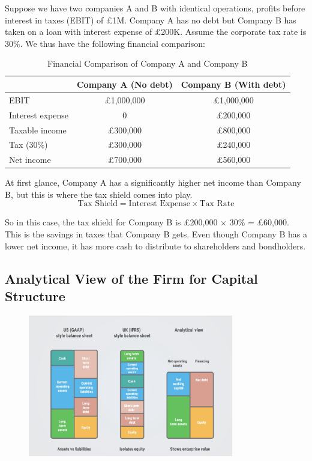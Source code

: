 Suppose we have two companies A and B with identical operations, profits before interest in taxes (EBIT) of £1M. Company A has no debt but Company B has taken on a loan with interest expense of £200K. Assume the corporate tax rate is 30\%. We thus have the following financial comparison:

\begin{table}[H]
    \centering
    \caption{Financial Comparison of Company A and Company B}
    \begin{tabular}{@{}lcc@{}}
    \toprule
     & \textbf{Company A (No debt)} & \textbf{Company B (With debt)} \\ 
    \midrule
    EBIT & £1,000,000 & £1,000,000 \\
    Interest expense & 0 & £200,000 \\
    Taxable income & £300,000 & £800,000 \\
    Tax (30\%) & £300,000 & £240,000 \\
    Net income & £700,000 & £560,000 \\
    \bottomrule
    \end{tabular}
\end{table}

At first glance, Company A has a significantly higher net income than Company B, but this is where the tax shield comes into play.\\

\begin{equation}
    \text{Tax Shield} = \text{Interest Expense} \times \text{Tax Rate}
\end{equation}

So in this case, the tax shield for Company B is £200,000 $\times$ 30\% = £60,000. This is the savings in taxes that Company B gets. Even though Company B has a lower net income, it has more cash to distribute to shareholders and bondholders.\\

\subsection{Analytical View of the Firm for Capital Structure}
\begin{figure}[H]
    \centering
    \includegraphics[width=0.8\textwidth]{img/7.3.1.png}
\end{figure}

